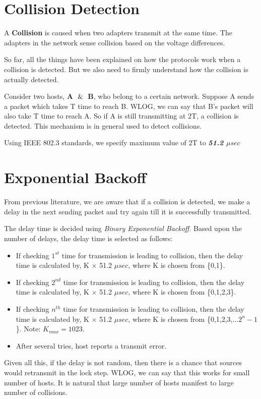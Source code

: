 \documentclass[12pt]{article}
\begin{document}

\section{Collision Detection}

    A \textbf{Collision} is caused when two adapters transmit at the same time. The adapters in the network sense collision based on the voltage differences.

So far, all the things have been explained on how the protocols work when a collision is detected. But we also need to firmly understand how the collision is actually detected.

Consider two hosts, \textbf{A} $\And$ \textbf{B}, who belong to a certain network. Suppose A sends a packet which takes T time to reach B. WLOG, we can say that B's packet will also take T time to reach A. So if A is still transmitting at 2T, a collision is detected. This mechanism is in general used to detect collisions.

Using IEEE 802.3 standards, we specify maximum value of 2T to \textbf{\textit{51.2 $\mu sec$}}


\section{Exponential Backoff}
From previous literature, we are aware that if a collision is detected, we make a delay in the next sending packet and try again till it is successfully transmitted.

The delay time is decided using \textit{Binary Exponential Backoff}.
Based upon the number of delays, the delay time is selected as follows:
\begin{itemize}
    \item If checking $1^{st}$ time for transmission is leading to collision, then     the delay time is calculated by, K $\times$ 51.2 $\mu sec$, where K is         chosen from \{0,1\}.
    \item If checking $2^{nd}$ time for transmission is leading to collision, then     the delay time is calculated by, K $\times$ 51.2 $\mu sec$, where K is         chosen from \{0,1,2,3\}.
    \item If checking $n^{th}$ time for transmission is leading to collision, then     the delay time is calculated by, K $\times$ 51.2 $\mu sec$, where K is         chosen from \{0,1,2,3,...$2^n-1$\}. Note: $K_{max} = 1023$.
    \item After several tries, host reports a transmit error.
\end{itemize}
Given all this, if the delay is not random, then there is a chance that sources would retransmit in the lock step. WLOG, we can say that this works for small number of hosts. It is natural that large number of hosts manifest to large number of collisions.
\end{document}
